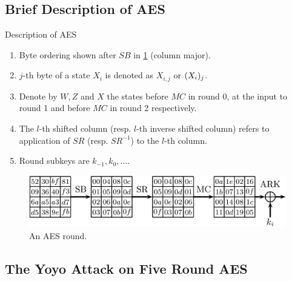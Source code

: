 \documentclass[notheorems]{beamer}
\theoremstyle{definition}
\theoremstyle{example}
\begin{document}
    \subsection{Brief Description of AES}
    \label{subsec:aes-description}

    \begin{frame}{Description of AES}
        \begin{enumerate}[<+->]
            \item Byte ordering shown after \(SB\) in \cref{fig:aes} (column
            major).
            \item \(j\)-th byte of a state \(X_i\) is denoted as \(X_{i,j}\) or
            \((X_i)_j\).
            \item Denote by \(W, Z\) and \(X\) the states before \(MC\) in round
            0, at the input to round 1 and before \(MC\) in round 2
            respectively.
            \item The \(l\)-th shifted column (resp. \(l\)-th inverse shifted
            column) refers to application of \(SR\) (resp. \(SR^{-1}\)) to the
            \(l\)-th column.
            \item Round subkeys are \(k_{-1}, k_0, \ldots\).
        \end{enumerate}
        \begin{figure}[!ht]
            \centering
            \includegraphics[width=0.85\columnwidth]{images/aes.png}
            \caption{An AES round.}
            \label{fig:aes}
        \end{figure}
    \end{frame}

    \subsection{The Yoyo Attack on Five Round AES}
    \label{subsec:yoyo-aes}
\end{document}
